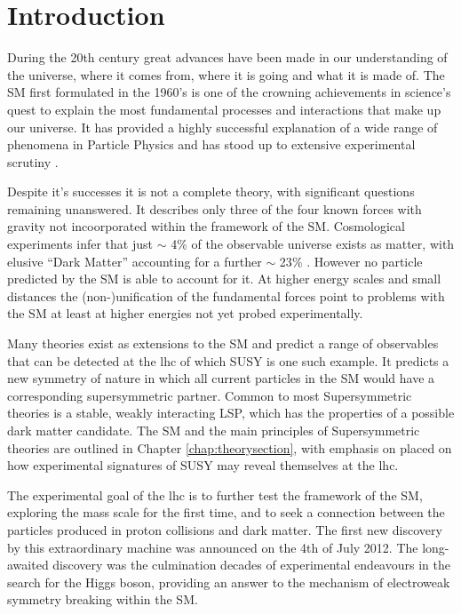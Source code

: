 \chapter{Introduction}
\label{chap:introduction}

During the 20th century great advances have been made in our understanding of the universe, where it comes from, where it is going and what it is made of. The \acf{SM} first formulated in the 1960's is one of the crowning achievements in science's quest to explain the most fundamental processes and interactions that make up our universe. It has provided a highly successful explanation of a wide range of phenomena in Particle Physics and has stood up to extensive experimental scrutiny \cite{pdg2012}.

Despite it's successes it is not  a complete theory, with significant questions remaining unanswered. It describes only three of the four known forces with gravity not incoorporated within the framework of the \ac{SM}. Cosmological experiments infer that just $\sim$ 4$\%$ of the observable universe exists as matter, with elusive ``Dark Matter'' accounting for a further $\sim$ 23$\%$ \cite{0067-0049-208-2-19}. However no particle predicted by the \ac{SM} is able to account for it.  At higher energy scales and small distances the (non-)unification of the fundamental forces point to problems with the \ac{SM} at least at higher energies not yet probed experimentally. 

Many theories exist as extensions to the \ac{SM} and predict a range of observables that can be detected at the \acf{lhc} of which \acf{SUSY} is one such example. It predicts a new symmetry of nature in which all current particles in the \ac{SM} would have a corresponding supersymmetric partner. Common to most Supersymmetric theories is a stable, weakly interacting \acf{LSP}, which has the properties of a possible dark matter candidate. The \ac{SM} and the main principles of Supersymmetric theories are outlined in Chapter \ref{chap:theorysection}, with emphasis on placed on how experimental signatures of \ac{SUSY} may reveal themselves at the \ac{lhc}.

The experimental goal of the \ac{lhc} is to further test the framework of the \ac{SM}, exploring the \TeV mass scale for the first time, and to seek a connection between the particles produced in proton collisions and dark matter. The first new discovery by this extraordinary machine was announced on the 4th of July 2012. The long-awaited discovery was the culmination decades of experimental endeavours in the search for the Higgs boson, providing an answer to the mechanism of electroweak symmetry breaking within the \ac{SM}. 

